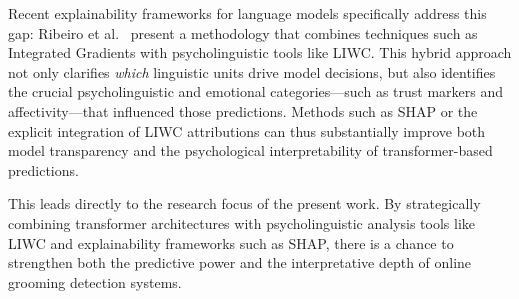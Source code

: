Recent explainability frameworks for language models specifically address this gap: Ribeiro et al.~\cite{ribeiro2024methodologyexplainablelargelanguage} present a methodology that combines techniques such as Integrated Gradients with psycholinguistic tools like LIWC. This hybrid approach not only clarifies \emph{which} linguistic units drive model decisions, but also identifies the crucial psycholinguistic and emotional categories—such as trust markers and affectivity—that influenced those predictions. Methods such as SHAP or the explicit integration of LIWC attributions can thus substantially improve both model transparency and the psychological interpretability of transformer-based predictions. %

This leads directly to the research focus of the present work. By strategically combining transformer architectures with psycholinguistic analysis tools like LIWC and explainability frameworks such as SHAP, there is a chance to strengthen both the predictive power and the interpretative depth of online grooming detection systems.
